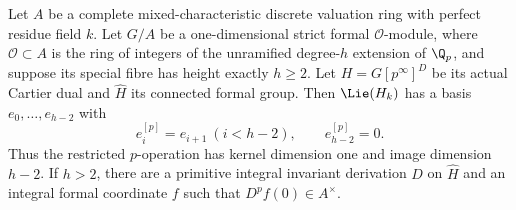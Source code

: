 \begin{proposition}\label{DP30}
Let $A$ be a complete mixed-characteristic discrete valuation ring with perfect residue field $k$. Let $G/A$ be a one-dimensional strict formal $\mathcal O$-module, where $\mathcal O\subset A$ is the ring of integers of the unramified degree-$h$ extension of $\Q_p$, and suppose its special fibre has height exactly $h\ge2$. Let $H=G[p^\infty]^D$ be its actual Cartier dual and $\widehat H$ its connected formal group. Then $\Lie(H_k)$ has a basis $e_0,\ldots,e_{h-2}$ with
\[
 e_i^{[p]}=e_{i+1}\ (i<h-2),\qquad e_{h-2}^{[p]}=0.
\]
Thus the restricted $p$-operation has kernel dimension one and image dimension $h-2$. If $h>2$, there are a primitive integral invariant derivation $D$ on $\widehat H$ and an integral formal coordinate $f$ such that $D^pf(0)\in A^\times$.
\end{proposition}
